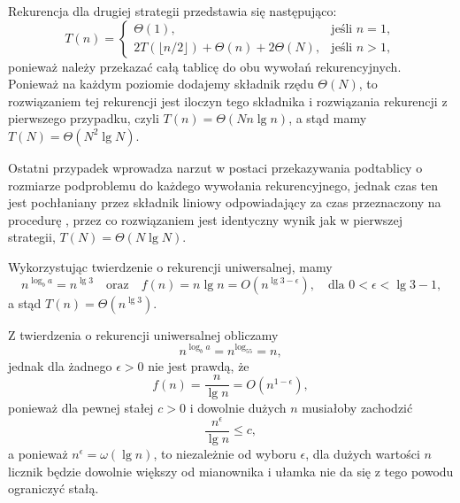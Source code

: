 Rekurencja dla drugiej strategii przedstawia się następująco:
\[
    T(n) = \begin{cases}
		\Theta(1), & \text{jeśli $n=1$}, \\
		2T(\lfloor n/2\rfloor)+\Theta(n)+2\Theta(N), & \text{jeśli $n>1$},
	\end{cases}
\]
ponieważ należy przekazać całą tablicę do obu wywołań rekurencyjnych. Ponieważ na każdym poziomie dodajemy składnik rzędu $\Theta(N)$, to rozwiązaniem tej rekurencji jest iloczyn tego składnika i rozwiązania rekurencji z pierwszego przypadku, czyli $T(n)=\Theta(Nn\lg n)$, a stąd mamy $T(N)=\Theta(N^2\lg N)$.

Ostatni przypadek wprowadza narzut w postaci przekazywania podtablicy o rozmiarze podproblemu do każdego wywołania rekurencyjnego, jednak czas ten jest pochłaniany przez składnik liniowy odpowiadający za czas przeznaczony na procedurę , przez co rozwiązaniem jest identyczny wynik jak w pierwszej strategii, $T(N)=\Theta(N\lg N)$.


\subproblem %
Wykorzystując twierdzenie o rekurencji uniwersalnej, mamy
\[
	n^{\log_ba} = n^{\lg3} \quad\text{oraz}\quad f(n) = n\lg n = O(n^{\lg3-\epsilon}), \quad\text{dla $0<\epsilon<\lg3-1$,}
\]
a stąd $T(n)=\Theta(n^{\lg3})$.

\subproblem %
Z twierdzenia o rekurencji uniwersalnej obliczamy
\[
	n^{\log_ba} = n^{\log_55} = n,
\]
jednak dla żadnego $\epsilon>0$ nie jest prawdą, że
\[
	f(n) = \frac{n}{\lg n} = O(n^{1-\epsilon}),
\]
ponieważ dla pewnej stałej $c>0$ i dowolnie dużych $n$ musiałoby zachodzić
\[
	\frac{n^\epsilon}{\lg n} \le c,
\]
a ponieważ $n^\epsilon=\omega(\lg n)$, to niezależnie od wyboru $\epsilon$, dla dużych wartości $n$ licznik będzie dowolnie większy od mianownika i ułamka nie da się z tego powodu ograniczyć stałą.

